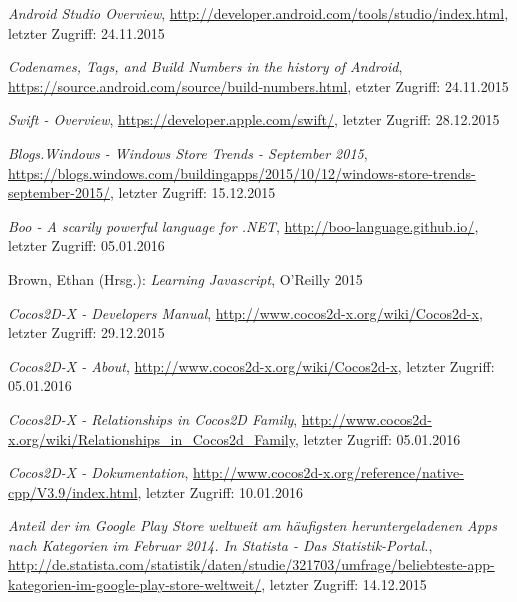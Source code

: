 \begin{thebibliography}{}

\emph{Android Studio Overview},
\url{http://developer.android.com/tools/studio/index.html}, letzter Zugriff: 24.11.2015

\emph{Codenames, Tags, and Build Numbers in the history of Android},
\url{https://source.android.com/source/build-numbers.html}, etzter Zugriff: 24.11.2015

\emph{Swift - Overview},
\url{https://developer.apple.com/swift/}, letzter Zugriff: 28.12.2015

\emph{Blogs.Windows - Windows Store Trends - September 2015},
\url{https://blogs.windows.com/buildingapps/2015/10/12/windows-store-trends-september-2015/}, letzter Zugriff: 15.12.2015

\emph{Boo - A scarily powerful language for .NET},
\url{http://boo-language.github.io/}, letzter Zugriff: 05.01.2016

Brown, Ethan (Hrsg.): 
\emph{Learning Javascript}, O'Reilly 2015

\emph{Cocos2D-X - Developers Manual},
\url{http://www.cocos2d-x.org/wiki/Cocos2d-x}, letzter Zugriff: 29.12.2015

\emph{Cocos2D-X - About},
\url{http://www.cocos2d-x.org/wiki/Cocos2d-x}, letzter Zugriff: 05.01.2016

\emph{Cocos2D-X - Relationships in Cocos2D Family},
\url{http://www.cocos2d-x.org/wiki/Relationships_in_Cocos2d_Family}, letzter Zugriff: 05.01.2016

\emph{Cocos2D-X - Dokumentation},
\url{http://www.cocos2d-x.org/reference/native-cpp/V3.9/index.html}, letzter Zugriff: 10.01.2016

\emph{Anteil der im Google Play Store weltweit am häufigsten heruntergeladenen Apps nach Kategorien im Februar 2014. In Statista - Das Statistik-Portal.},
\url{http://de.statista.com/statistik/daten/studie/321703/umfrage/beliebteste-app-kategorien-im-google-play-store-weltweit/}, letzter Zugriff: 14.12.2015


\end{thebibliography}
